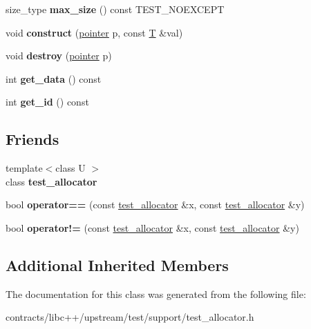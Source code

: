 \begin{DoxyCompactItemize}
size\+\_\+type {\bfseries max\+\_\+size} () const T\+E\+S\+T\+\_\+\+N\+O\+E\+X\+C\+E\+PT
\item 
\mbox{\label{classtest__allocator_a1ac41b2dc0a408c947872a2e282138f8}} 
void {\bfseries construct} (\mbox{\hyperlink{struct_t}{pointer}} p, const \mbox{\hyperlink{struct_t}{T}} \&val)
\item 
\mbox{\label{classtest__allocator_ac66d6705d519853fa14135c4887ae4d0}} 
void {\bfseries destroy} (\mbox{\hyperlink{struct_t}{pointer}} p)
\item 
\mbox{\label{classtest__allocator_aedfeccc76e72148620df444a8e47932c}} 
int {\bfseries get\+\_\+data} () const
\item 
\mbox{\label{classtest__allocator_a592fbaeb0847401d7754aef306728a31}} 
int {\bfseries get\+\_\+id} () const
\end{DoxyCompactItemize}
\subsection*{Friends}
\begin{DoxyCompactItemize}
\item 
\mbox{\label{classtest__allocator_a8a679cbfef131387d1d1c5f32f936ad0}} 
{\footnotesize template$<$class U $>$ }\\class {\bfseries test\+\_\+allocator}
\item 
\mbox{\label{classtest__allocator_aac919e1c35caa86812a1e8ceee0a2267}} 
bool {\bfseries operator==} (const \mbox{\hyperlink{classtest__allocator}{test\+\_\+allocator}} \&x, const \mbox{\hyperlink{classtest__allocator}{test\+\_\+allocator}} \&y)
\item 
\mbox{\label{classtest__allocator_a1a834e72480aa7b535e9ec4db1d64743}} 
bool {\bfseries operator!=} (const \mbox{\hyperlink{classtest__allocator}{test\+\_\+allocator}} \&x, const \mbox{\hyperlink{classtest__allocator}{test\+\_\+allocator}} \&y)
\end{DoxyCompactItemize}
\subsection*{Additional Inherited Members}


The documentation for this class was generated from the following file\+:\begin{DoxyCompactItemize}
\item 
contracts/libc++/upstream/test/support/test\+\_\+allocator.\+h\end{DoxyCompactItemize}
